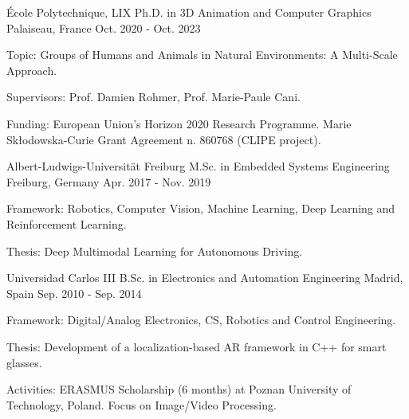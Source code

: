 

\begin{cventries}

  \cventry
    {École Polytechnique, LIX} %
    {Ph.D. in 3D Animation and Computer Graphics} %
    {Palaiseau, France} %
    {Oct. 2020 - Oct. 2023} %
    {
      \begin{cvitems} %
        \item {Topic: Groups of Humans and Animals in Natural Environments: A Multi-Scale Approach.}
        \item {Supervisors: Prof. Damien Rohmer, Prof. Marie-Paule Cani.}
        \item {Funding: European Union’s Horizon 2020 Research Programme. Marie Skłodowska-Curie Grant Agreement n. 860768 (CLIPE project).}
      \end{cvitems}
    }

  \cventry
    {Albert-Ludwigs-Universität Freiburg} %
    {M.Sc. in Embedded Systems Engineering} %
    {Freiburg, Germany} %
    {Apr. 2017 - Nov. 2019} %
    {
      \begin{cvitems} %
        \item {Framework: Robotics, Computer Vision, Machine Learning, Deep Learning and Reinforcement Learning.}
        \item {Thesis: Deep Multimodal Learning for Autonomous Driving.}
      \end{cvitems}
    }

  \cventry
    {Universidad Carlos III} %
    {B.Sc. in Electronics and Automation Engineering} %
    {Madrid, Spain} %
    {Sep. 2010 - Sep. 2014} %
    {
      \begin{cvitems} %
        \item {Framework: Digital/Analog Electronics, CS, Robotics and Control Engineering.}
        \item {Thesis: Development of a localization-based AR framework in C++ for smart glasses.}
        \item {Activities: ERASMUS Scholarship (6 months) at Poznan University of Technology, Poland. Focus on Image/Video Processing.}
      \end{cvitems}
    }

\end{cventries}

